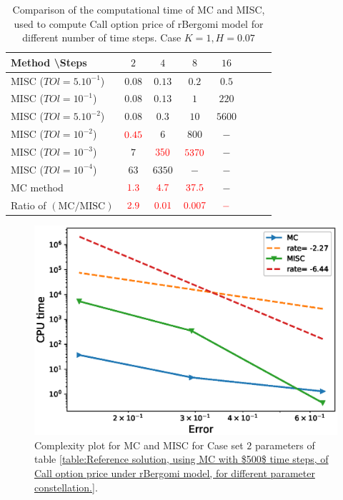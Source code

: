 \documentclass[11pt]{article}
\begin{document}
\begin{table}[h!]
	\centering
	\begin{tabular}{l*{6}{c}r}
		Method \textbackslash  Steps            & $2$ & $4$ & $8$ & $16$ &   \\
		\hline
			MISC ($TOl=5.10^{-1}$)  & $0.08$ & $0.13$ & $0.2$ & $0.5$  \\
		MISC ($TOl=10^{-1}$)  & $0.08$ & $0.13$ & $1$ & $220$  \\
		MISC ($TOl=5.10^{-2}$)  & $0.08$ & $0.3$ & $10$ & $5600$  \\
		MISC ($TOl=10^{-2}$)  & ${\color{red}0.45}$ & $6$ & $800$ & $-$  \\
		MISC ($TOl=10^{-3}$)  & $7$ & ${\color{red}350}$ & ${\color{red}5370}$ & $-$  \\		
			MISC ($TOl=10^{-4}$)  & $63$ & $6350$ & $-$ & $-$  \\	
\hline
		MC method & ${\color{red}1.3}$  & ${\color{red}4.7}$  & ${\color{red}37.5}$ & $-$  \\
		\hline	
		Ratio of $\left(\text{MC}/ \text{MISC} \right)$  &${\color{red}2.9}$ & ${\color{red}    0.01 
		}$  & ${\color{red} 0.007	}$  & ${\color{red}-}$ \\
		\hline
	\end{tabular}
	\caption{Comparison of the computational time of  MC and MISC, used to compute Call option price of rBergomi model for different number of time steps. Case $K=1, H=0.07$}
	\label{Comparsion of the computational time of  MC and MISC, used to compute Call option price of rBergomi model for different number of time steps. Case $K=1, H=0.07$}
\end{table}




	\begin{figure}[h!]
	\centering
	\includegraphics[width=0.7\linewidth]{./figures/rBergomi_Complexity_rates/set2/error_vs_time_set2}
	
	\caption{Complexity plot for   MC and MISC for Case set $2$ parameters of table \ref{table:Reference solution, using MC with $500$ time steps, of Call option price under rBergomi model, for different parameter constellation.}.}
	\label{fig:Complexity plot for MC and MISC for Case set $2$ parameters}
\end{figure}
\end{document}
